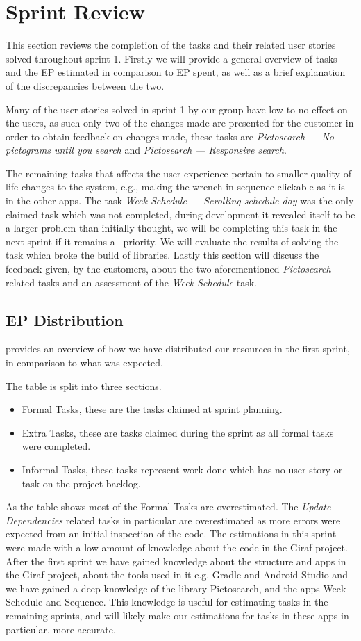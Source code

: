 \section{Sprint Review}\label{s1rev}
This section reviews the completion of the tasks and their related user stories solved throughout sprint 1.
Firstly we will provide a general overview of tasks and the EP estimated in comparison to EP spent, as well as a brief explanation of the discrepancies between the two.

Many of the user stories solved in sprint 1 by our group have low to no effect on the users, as such only two of the changes made are presented for the customer in order to obtain feedback on changes made, these tasks are \textit{Pictosearch --- No pictograms until you search} and \textit{Pictosearch --- Responsive search}.

The remaining tasks that affects the user experience pertain to smaller quality of life changes to the system, e.g., making the wrench in sequence clickable as it is in the other apps.
The task \textit{Week Schedule --- Scrolling schedule day} was the only claimed task which was not completed, during development it revealed itself to be a larger problem than initially thought, we will be completing this task in the next sprint if it remains a \phigh~priority.
We will evaluate the results of solving the \pblocking-task which broke the build of libraries.
Lastly this section will discuss the feedback given, by the customers, about the two aforementioned \textit{Pictosearch} related tasks and an assessment of the \textit{Week Schedule} task.

\subsection{EP Distribution}
 provides an overview of how we have distributed our resources in the first sprint, in comparison to what was expected.

The table is split into three sections.
\begin{itemize}
    \item Formal Tasks, these are the tasks claimed at sprint planning.
    \item Extra Tasks, these are tasks claimed during the sprint as all formal tasks were completed.
    \item Informal Tasks, these tasks represent work done which has no user story or task on the project backlog.
\end{itemize}
As the table shows most of the Formal Tasks are overestimated.
The \textit{Update Dependencies} related tasks in particular are overestimated as more errors were expected from an initial inspection of the code.
The estimations in this sprint were made with a low amount of knowledge about the code in the Giraf project.
After the first sprint we have gained knowledge about the structure and apps in the Giraf project, about the tools used in it e.g. Gradle and Android Studio and we have gained a deep knowledge of the library Pictosearch, and the apps Week Schedule and Sequence.
This knowledge is useful for estimating tasks in the remaining sprints, and will likely make our estimations for tasks in these apps in particular, more accurate.

